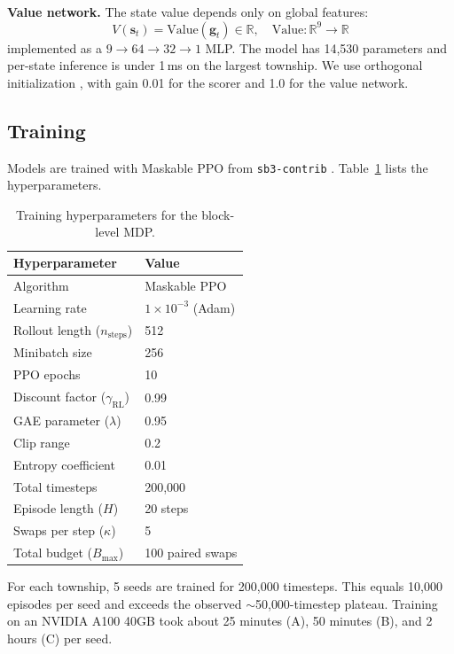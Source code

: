 \documentclass[preprint,12pt]{elsarticle}
\begin{document}
\textbf{Value network.} The state value depends only on global features:
\begin{equation}
V(\mathbf{s}_t) = \text{Value}(\mathbf{g}_t) \in \mathbb{R}, \quad \text{Value}: \mathbb{R}^{9} \to \mathbb{R}
\end{equation}
implemented as a $9\to64\to32\to1$ MLP. The model has 14{,}530 parameters and per-state inference is under 1\,ms on the largest township. We use orthogonal initialization \citep{saxe2014exact}, with gain 0.01 for the scorer and 1.0 for the value network.

\subsection{Training}
\label{sec:training}

Models are trained with Maskable PPO from \texttt{sb3-contrib} \citep{huang2022closer}. Table~\ref{tab:hyperparams} lists the hyperparameters.

\begin{table}[htbp]
\centering
\caption{Training hyperparameters for the block-level MDP.}
\label{tab:hyperparams}
\begin{tabular}{ll}
\toprule
Hyperparameter & Value \\
\midrule
Algorithm & Maskable PPO \\
Learning rate & $1 \times 10^{-3}$ (Adam) \\
Rollout length ($n_{\text{steps}}$) & 512 \\
Minibatch size & 256 \\
PPO epochs & 10 \\
Discount factor ($\gamma_{\text{RL}}$) & 0.99 \\
GAE parameter ($\lambda$) & 0.95 \\
Clip range & 0.2 \\
Entropy coefficient & 0.01 \\
Total timesteps & 200{,}000 \\
Episode length ($H$) & 20 steps \\
Swaps per step ($\kappa$) & 5 \\
Total budget ($B_{\max}$) & 100 paired swaps \\
\bottomrule
\end{tabular}
\end{table}

For each township, 5 seeds are trained for 200{,}000 timesteps. This equals 10{,}000 episodes per seed and exceeds the observed $\sim$50{,}000-timestep plateau. Training on an NVIDIA A100 40GB took about 25 minutes (A), 50 minutes (B), and 2 hours (C) per seed.
\end{document}
